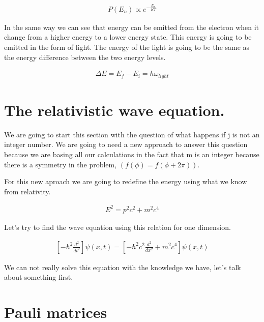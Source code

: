 \begin{equation}
  \begin{array}{c}
    P(E_n) \propto e^{-\frac{E_n}{KT}}
  \end{array}
\end{equation}

In the same way we can see that energy can be emitted from the electron when it change from a higher energy to a lower energy state. This energy is going to be emitted in the form of light. The energy of the light is going to be the same as the energy difference between the two energy levels.

\begin{equation}
  \begin{array}{c}
    \Delta E = E_f - E_i = h\omega_{light}
  \end{array}
\end{equation}


\section{The relativistic wave equation.}

We are going to start this section with the question of what happens if j is not an integer number. We are going to need a new approach to answer this question because we are basing all our calculations in the fact that m is an integer because there is a symmetry in the problem, $(f(\phi)=f(\phi+2\pi))$.

For this new aproach we are going to redefine the energy using what we know from relativity.

\begin{equation}
  \begin{array}{c}
    E^2 = p^2c^2 + m^2c^4
  \end{array}
\end{equation}

Let's try to find the wave equation using this relation for one dimension.

\begin{equation}
  \begin{array}{c}
   \left[-\hbar^2\frac{d^2}{dt^2}\right]\psi(x,t) = \left[- \hbar^2c^2\frac{d^2}{dx^2}+m^2c^4\right]\psi(x,t)
  \end{array}
\end{equation}

We can not really solve this equation with the knowledge we have, let's talk about something first.

\section{Pauli matrices}

